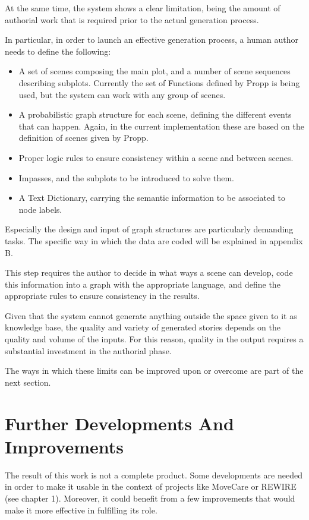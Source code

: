 \documentclass[12pt,a4paper,oneside]{report}
\begin{document}
At the same time, the system shows a clear limitation, being the amount of authorial work that is required prior to the actual generation process.

In particular, in order to launch an effective generation process, a human author needs to define the following:
\begin{itemize}\setlength{\itemsep}{0pt}
\item A set of scenes composing the main plot, and a number of scene sequences describing subplots. Currently the set of Functions defined by Propp is being used, but the system can work with any group of scenes.
\item A probabilistic graph structure for each scene, defining the different events that can happen. Again, in the current implementation these are based on the definition of scenes given by Propp.
\item Proper logic rules to ensure consistency within a scene and between scenes.
\item Impasses, and the subplots to be introduced to solve them.
\item A Text Dictionary, carrying the semantic information to be associated to node labels.
\end{itemize}

Especially the design and input of graph structures are particularly demanding tasks. The specific way in which the data are coded will be explained in appendix B.

This step requires the author to decide in what ways a scene can develop, code this information into a graph with the appropriate language, and define the appropriate rules to ensure consistency in the results.

Given that the system cannot generate anything outside the space given to it as knowledge base, the quality and variety of generated stories depends on the quality and volume of the inputs. For this reason, quality in the output requires a substantial investment in the authorial phase.

\bigskip

The ways in which these limits can be improved upon or overcome are part of the next section.

\pagebreak

\section{Further Developments And Improvements}

The result of this work is not a complete product. Some developments are needed in order to make it usable in the context of projects like MoveCare or REWIRE (see chapter 1). Moreover, it could benefit from a few improvements that would make it more effective in fulfilling its role.
\end{document}

